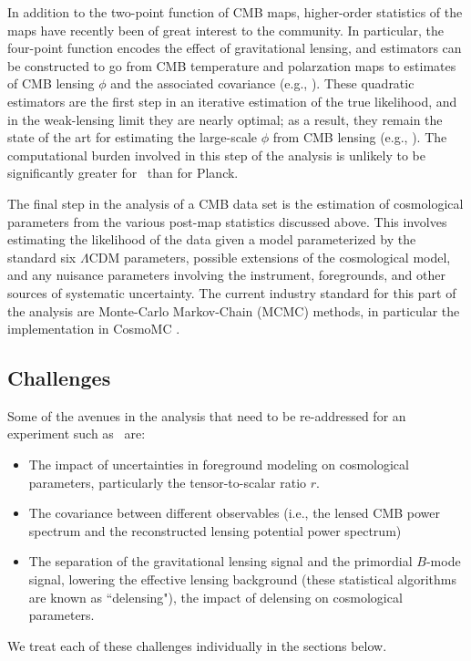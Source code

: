 In addition to the two-point function of CMB maps, higher-order statistics of the maps have recently 
been of great interest to the community. In particular, the four-point function encodes the effect of 
gravitational lensing, and estimators can be constructed to go from CMB temperature and polarzation
maps to estimates of CMB lensing $\phi$ and the associated covariance (e.g., \cite{hu02a,okamoto03}).
These quadratic estimators are the first step in an iterative estimation of the true likelihood, and in
the weak-lensing limit they are nearly optimal; as a result, they remain the state of the art for estimating
the large-scale $\phi$ from CMB lensing (e.g., \cite{planck13-18}). The computational burden involved
in this step of the analysis is unlikely to be significantly greater for \cmbexp\ than for Planck.

The final step in the analysis of a CMB data set is the estimation of cosmological parameters from
the various post-map statistics discussed above. This involves estimating the likelihood of the data
given a model parameterized by the standard six $\Lambda$CDM parameters, possible extensions
of the cosmological model, and any nuisance parameters involving the instrument, foregrounds, and
other sources of systematic uncertainty. The current industry standard for this part of the analysis are
Monte-Carlo Markov-Chain (MCMC) methods, in particular the implementation in CosmoMC
\cite{lewis02b}.

\subsection{Challenges}
\label{se:challenges}
Some of the avenues in the analysis that need to be re-addressed for an experiment such as \cmbexp\ are: 
\begin{itemize}
\item{The impact of uncertainties in foreground modeling on cosmological parameters, particularly the tensor-to-scalar ratio $r$.}
\item{The covariance between different observables (i.e., the lensed CMB power spectrum and the reconstructed lensing potential power spectrum)}
\item{The separation of the gravitational lensing signal and the primordial $B$-mode signal, lowering the effective lensing background (these statistical algorithms are known as ``delensing"), the impact of delensing on cosmological parameters.} 
\end{itemize}
We treat each of these challenges individually in the sections below.

